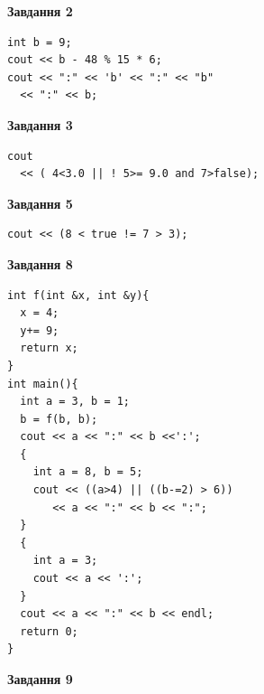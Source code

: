 \documentclass[12pt, ukrainian]{article}
\begin{document}
{\begin {large}
\begin{minipage}[t]{7.0cm}
\end{minipage}
\vline \hspace{1mm}
\begin{minipage}[t]{11.0cm}

\begin{center}
\textbf{Завдання 2}
\end{center}
\vspace{-8mm}

\begin{verbatim}
int b = 9;
cout << b - 48 % 15 * 6;
cout << ":" << 'b' << ":" << "b" 
  << ":" << b;
\end{verbatim}



\begin{center}
\textbf{Завдання 3}
\end{center}
\vspace{-8mm}

\begin{verbatim}
cout 
  << ( 4<3.0 || ! 5>= 9.0 and 7>false);
\end{verbatim}



\begin{center}
\textbf{Завдання 5}
\end{center}
\vspace{-8mm}

\begin{verbatim}
cout << (8 < true != 7 > 3);
\end{verbatim}



\begin{center}
\textbf{Завдання 8}
\end{center}
\vspace{-8mm}

\begin{verbatim}
int f(int &x, int &y){
  x = 4;
  y+= 9;
  return x;
}
int main(){
  int a = 3, b = 1;
  b = f(b, b);
  cout << a << ":" << b <<':';
  {
    int a = 8, b = 5;
    cout << ((a>4) || ((b-=2) > 6))
       << a << ":" << b << ":";
  }
  {
    int a = 3;
    cout << a << ':';
  }
  cout << a << ":" << b << endl;
  return 0;
}
\end{verbatim}

\end{minipage}


\begin{minipage}[t]{7.0cm}

\begin{center}
\textbf{Завдання 9}
\end{center}
\vspace{-8mm}


\end{minipage}
\end{large}}
\end{document}
